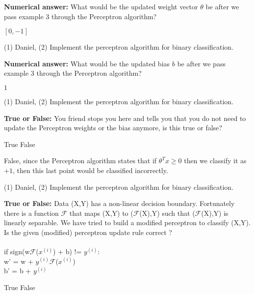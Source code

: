 \begin{questions}
\question[1] \textbf{Numerical answer:} What would be the updated weight vector $\theta$ be after we pass example 3 through the Perceptron algorithm?
    \begin{tcolorbox}[fit,height=1cm, width=3cm, blank, borderline={1pt}{-2pt}]
    \end{tcolorbox}
    \begin{soln}
    $[0,-1]$
    \end{soln}
    \begin{qauthor}
    (1) Daniel, (2) Implement the perceptron algorithm for binary
classification.
    \end{qauthor}
    
\question[1] \textbf{Numerical answer:} What would be the updated bias $b$ be after we pass example 3 through the Perceptron algorithm?
    \begin{tcolorbox}[fit,height=1cm, width=2cm, blank, borderline={1pt}{-2pt}]
    \end{tcolorbox}
    \begin{soln}
    $1$
    \end{soln}
    \begin{qauthor}
    (1) Daniel, (2) Implement the perceptron algorithm for binary
classification.
    \end{qauthor}
    
    \question[1] \textbf{True or False:} You friend stops you here and tells you that you do not need to update the Perceptron weights or the bias anymore, is this true or false?
    \begin{checkboxes}
     \choice True 
     \choice False
    \end{checkboxes}
    \begin{soln}
    False, since the Perceptron algorithm states that if $\theta^T x \geq 0$ then we classify it as $+1$, then this last point would be classified incorrectly.
    \end{soln}
    \begin{qauthor}
    (1) Daniel, (2) Implement the perceptron algorithm for binary
classification.
    \end{qauthor}

   \question[2] \textbf{True or False: }Data (X,Y) has a non-linear decision boundary. Fortunately there is a function $\mathcal{F}$ that maps (X,Y) to ($\mathcal{F}$(X),Y) such that ($\mathcal{F}$(X),Y) is linearly separable. We have tried to build a modified perceptron to classify (X,Y). Is the given (modified) perceptron update rule correct ?\\
    \\if sign(w$\mathcal{F}$($x^{(i)}$) + b) != $y^{(i)}$:\\
    \indent w' = w + $y^{(i)}$$\mathcal{F}$($x^{(i)}$)\\
    \indent b' = b + $y^{(i)}$
    \begin{checkboxes}
        \choice True
        \choice False
    \end{checkboxes}
    

\end{questions}
